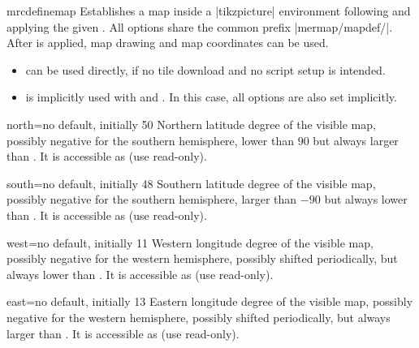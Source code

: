 \begin{docCommand}{mrcdefinemap}{}
  Establishes a map inside a |tikzpicture| environment following
  and applying the given .
  All options share the common prefix |mermap/mapdef/|.
  After  is applied, map drawing and map coordinates
  can be used.
  \begin{itemize}
  \item{} can be used directly, if no tile download
    and no script setup is intended.
  \item{} is implicitly used with
     and . In this case, all options are
    also set implicitly.
  \end{itemize}
\end{docCommand}


\begin{docMrcKey}[mapdef]{north}{=}{no default, initially 50}
  Northern latitude degree of the visible map, possibly negative for the southern hemisphere,
  lower than $90$ but always larger than .
  It is accessible as  (use read-only).
\end{docMrcKey}

\begin{docMrcKey}[mapdef]{south}{=}{no default, initially 48}
  Southern latitude degree of the visible map, possibly negative for the southern hemisphere,
  larger than $-90$ but always lower than .
  It is accessible as  (use read-only).
\end{docMrcKey}

\begin{docMrcKey}[mapdef]{west}{=}{no default, initially 11}
  Western longitude degree of the visible map, possibly negative for the western hemisphere,
  possibly shifted periodically, but always lower than .
  It is accessible as  (use read-only).
\end{docMrcKey}

\begin{docMrcKey}[mapdef]{east}{=}{no default, initially 13}
  Eastern longitude degree of the visible map, possibly negative for the western hemisphere,
  possibly shifted periodically, but always larger than .
  It is accessible as  (use read-only).
\end{docMrcKey}


